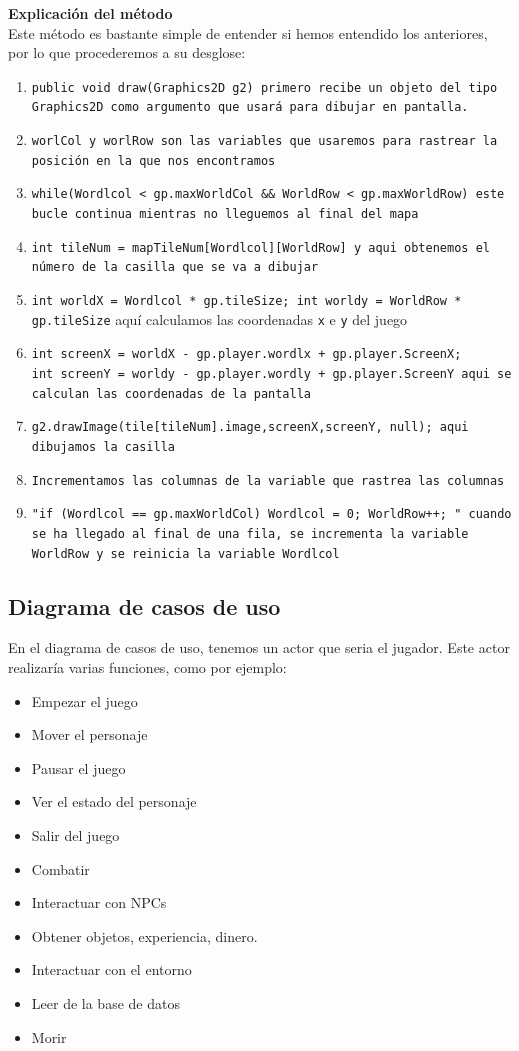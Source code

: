 \documentclass[a4paper]{article}
\begin{document}
\textbf{Explicación del método}\\
Este método es bastante simple de entender si hemos entendido los anteriores, por lo que procederemos a su desglose:
\begin{enumerate}
    \item \texttt{public void draw(Graphics2D g2) primero recibe un objeto del tipo Graphics2D como argumento que usará para dibujar en pantalla.}
    \item \texttt{worlCol y worlRow son las variables que usaremos para rastrear la posición en la que nos encontramos}
    \item \texttt{while(Wordlcol < gp.maxWorldCol \&\& WorldRow < gp.maxWorldRow) este bucle continua mientras no lleguemos al final del mapa}
    \item \texttt{int tileNum = mapTileNum[Wordlcol][WorldRow] y aqui obtenemos el número de la casilla que se va a dibujar}
    \item \texttt{int worldX = Wordlcol * gp.tileSize; int worldy = WorldRow * gp.tileSize} aquí calculamos las coordenadas \texttt{x} e \texttt{y} del juego
    \item \texttt{int screenX = worldX - gp.player.wordlx + gp.player.ScreenX; \\int screenY = worldy - gp.player.wordly + gp.player.ScreenY aqui se calculan las coordenadas de la pantalla}
    \item \texttt{g2.drawImage(tile[tileNum].image,screenX,screenY, null); aqui dibujamos la casilla}
    \item \texttt{Incrementamos las columnas de la variable que rastrea las columnas}
    \item \texttt{"if (Wordlcol == gp.maxWorldCol){ Wordlcol = 0; WorldRow++; }" cuando se ha llegado al final de una fila, se incrementa la variable WorldRow y se reinicia la variable Wordlcol}
\end{enumerate}



\clearpage
\subsection{Diagrama de casos de uso}
En el diagrama de casos de uso, tenemos un actor que seria el jugador. Este actor realizaría varias funciones, como por ejemplo:
\begin{itemize}
    \item Empezar el juego
    \item Mover el personaje
    \item Pausar el juego
    \item Ver el estado del personaje
    \item Salir del juego
    \item Combatir
    \item Interactuar con NPCs
    \item Obtener objetos, experiencia, dinero.
    \item Interactuar con el entorno
    \item Leer de la base de datos
    \item Morir
\end{itemize}
\end{document}
